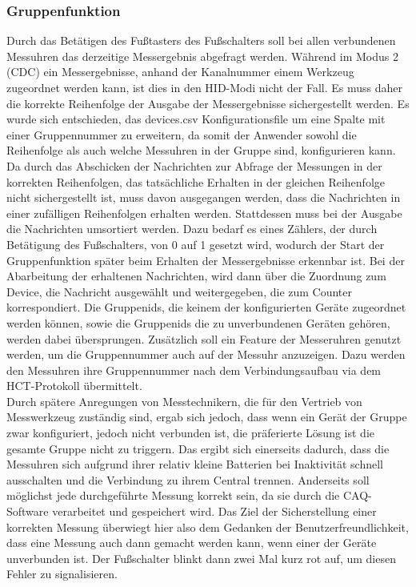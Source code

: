 \subsubsection{Gruppenfunktion}
\label{Gruppenfunktion}
Durch das Betätigen des Fußtasters des Fußschalters soll bei allen verbundenen Messuhren das derzeitige Messergebnis abgefragt werden. Während im Modus 2 (\ac{CDC}) ein Messergebnisse, anhand der Kanalnummer einem Werkzeug zugeordnet werden kann, ist dies in den \ac{HID}-Modi nicht der Fall. Es muss daher die korrekte Reihenfolge der Ausgabe der Messergebnisse sichergestellt werden. Es wurde sich entschieden, das devices.csv Konfigurationsfile um eine Spalte mit einer Gruppennummer zu erweitern, da somit der Anwender sowohl die Reihenfolge als auch welche Messuhren in der Gruppe sind, konfigurieren kann. Da durch das Abschicken der Nachrichten zur Abfrage der Messungen in der korrekten Reihenfolgen, das tatsächliche Erhalten in der gleichen Reihenfolge nicht sichergestellt ist, muss davon ausgegangen werden, dass die Nachrichten in einer zufälligen Reihenfolgen erhalten werden. Stattdessen muss bei der Ausgabe die Nachrichten umsortiert werden. Dazu bedarf es eines Zählers, der durch Betätigung des Fußschalters, von 0 auf 1 gesetzt wird, wodurch der Start der Gruppenfunktion später beim Erhalten der Messergebnisse erkennbar ist. Bei der Abarbeitung der erhaltenen Nachrichten, wird dann über die Zuordnung zum Device, die Nachricht ausgewählt und weitergegeben, die zum Counter korrespondiert. Die Gruppenids, die keinem der konfigurierten Geräte zugeordnet werden können, sowie die Gruppenids die zu unverbundenen Geräten gehören, werden dabei übersprungen. Zusätzlich soll ein Feature der Messeruhren genutzt werden, um die Gruppennummer auch auf der Messuhr anzuzeigen. Dazu werden den Messuhren ihre Gruppennummer nach dem Verbindungsaufbau via dem \ac{HCT}-Protokoll übermittelt.\\
Durch spätere Anregungen von Messtechnikern, die für den Vertrieb von Messwerkzeug zuständig sind, ergab sich jedoch, dass wenn ein Gerät der Gruppe zwar konfiguriert, jedoch nicht verbunden ist, die präferierte Lösung ist die gesamte Gruppe nicht zu triggern. Das ergibt sich einerseits dadurch, dass die Messuhren sich aufgrund ihrer relativ kleine Batterien bei Inaktivität schnell ausschalten und die Verbindung zu ihrem Central trennen. Anderseits soll möglichst jede durchgeführte Messung korrekt sein, da sie durch die \ac{CAQ}-Software verarbeitet und gespeichert wird. Das Ziel der Sicherstellung einer korrekten Messung überwiegt hier also dem Gedanken der Benutzerfreundlichkeit, dass eine Messung auch dann gemacht werden kann, wenn einer der Geräte unverbunden ist. Der Fußschalter blinkt dann zwei Mal kurz rot auf, um diesen Fehler zu signalisieren.\\
